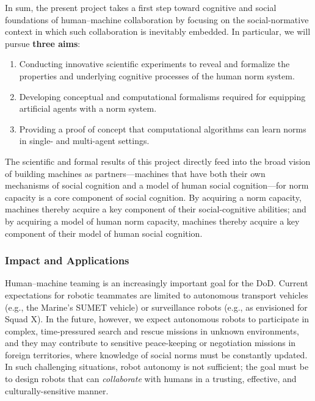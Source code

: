 \documentclass[12pt]{article}
\begin{document}
\vspace{2mm}

\noindent In sum, the present project takes a first step toward cognitive and
social foundations of human--machine collaboration by focusing on the
social-normative context in which such collaboration is inevitably
embedded.  In particular, we will pursue {\bf three aims}:

\begin{enumerate}[label=\bfseries Aim \arabic*:, leftmargin=*,align=left]

\item Conducting innovative scientific experiments to reveal and
  formalize the properties and underlying cognitive processes of the
  human norm system.  \vspace{-1 mm}
\item Developing conceptual and computational formalisms required for
  equipping artificial agents with a norm system.  \vspace{-1 mm}
\item Providing a proof of concept that computational algorithms can
  learn norms in single- and multi-agent settings.

\end{enumerate}

The scientific and formal results of this project directly feed into
the broad vision of building machines as partners---machines that have
both their own mechanisms of social cognition and a model of human social cognition---for norm capacity is a core component of social
cognition.  By acquiring a norm capacity, machines
thereby acquire a key component of their social-cognitive
abilities; and by acquiring a model of human norm capacity, machines
thereby acquire a key component of their model of human social
cognition.

\subsubsection*{Impact and Applications}

Human--machine teaming is an increasingly important goal for the DoD.
Current expectations for robotic teammates are limited to autonomous
transport vehicles (e.g., the Marine's SUMET vehicle) or surveillance
robots (e.g., as envisioned for Squad X).  In the future, however, we
expect autonomous robots to participate in complex, time-pressured
search and rescue missions in unknown environments, and they may
contribute to sensitive peace-keeping or negotiation missions in
foreign territories, where knowledge of social norms must be
constantly updated.  In such challenging situations, robot autonomy is
not sufficient; the goal must be to design robots that can {\em
  collaborate} with humans in a trusting, effective, and
culturally-sensitive manner.
\end{document}
